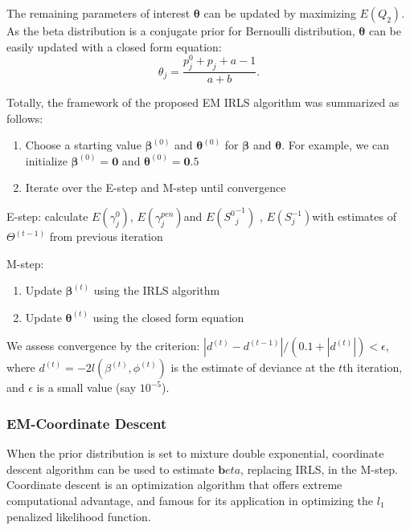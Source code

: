\documentclass[AMA,STIX1COL,]{WileyNJD-v2}
\begin{document}
The remaining parameters of interest \(\boldsymbol{\theta}\) can be
updated by maximizing \(E(Q_2)\). As the beta distribution is a
conjugate prior for Bernoulli distribution, \(\boldsymbol{\theta}\) can
be easily updated with a closed form equation: \[
\theta_j = \frac{p^0_j + p_{j} + a - 1 }{a + b}.
\]

Totally, the framework of the proposed EM IRLS algorithm was summarized
as follows:

\begin{enumerate}
\def\labelenumi{\arabic{enumi})}
\item
  Choose a starting value \(\boldsymbol{\beta}^{(0)}\) and
  \(\boldsymbol{\theta}^{(0)}\) for \(\boldsymbol{\beta}\) and
  \(\boldsymbol{\theta}\). For example, we can initialize
  \(\boldsymbol{\beta}^{(0)} = \boldsymbol{0}\) and
  \(\boldsymbol{\theta}^{(0)} = \boldsymbol{0}.5\)
\item
  Iterate over the E-step and M-step until convergence
\end{enumerate}

E-step: calculate \(E(\gamma^0_{j})\), \(E(\gamma^{pen}_{j})\)and
\(E({S^0}^{-1}_{j})\) , \(E({S}^{-1}_{j})\)with estimates of
\(\Theta^{(t-1)}\) from previous iteration

M-step:

\begin{enumerate}
\def\labelenumi{\alph{enumi})}
\item
  Update \(\boldsymbol{\beta}^{(t)}\) using the IRLS algorithm
\item
  Update \(\boldsymbol{\theta}^{(t)}\) using the closed form equation
\end{enumerate}

We assess convergence by the criterion:
\(|d^{(t)}-d^{(t-1)}|/(0.1+|d^{(t)}|)<\epsilon\), where
\(d^{(t)} = -2l(\beta^{(t)},\phi^{(t)})\) is the estimate of deviance at
the \(t\)th iteration, and \(\epsilon\) is a small value (say
\(10^{-5}\)).

\hfill\break

\hypertarget{em-coordinate-descent}{%
\subsubsection{EM-Coordinate Descent}\label{em-coordinate-descent}}

When the prior distribution is set to mixture double exponential,
coordinate descent algorithm can be used to estimate
\(\boldsymbol{b}eta\), replacing IRLS, in the M-step. Coordinate descent
is an optimization algorithm that offers extreme computational
advantage, and famous for its application in optimizing the \(l_1\)
penalized likelihood function.
\end{document}
